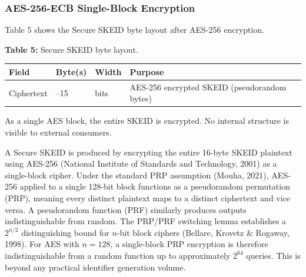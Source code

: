 \documentclass[fleqn,10pt]{wlpeerj}
\newcounter{none} %
\begin{document}
\subsubsection{AES-256-ECB Single-Block
Encryption}\label{aes-256-ecb-single-block-encryption}

Table 5 shows the Secure SKEID byte layout after AES-256 encryption.

\textbf{Table 5:} Secure SKEID byte layout.

{\def\LTcaptype{none} %
\begin{longtable}[]{@{}
  >{\raggedright\arraybackslash}p{}
  >{\raggedright\arraybackslash}p{}
  >{\raggedright\arraybackslash}p{}
  >{\raggedright\arraybackslash}p{}@{}}
\toprule\noalign{}
\begin{minipage}[b]{\linewidth}\raggedright
Field
\end{minipage} & \begin{minipage}[b]{\linewidth}\raggedright
Byte(s)
\end{minipage} & \begin{minipage}[b]{\linewidth}\raggedright
Width
\end{minipage} & \begin{minipage}[b]{\linewidth}\raggedright
Purpose
\end{minipage} \\
\midrule\noalign{}
\endhead
\bottomrule\noalign{}
\endlastfoot
Ciphertext & 0--15 & 128 bits & AES-256 encrypted SKEID (pseudorandom
bytes) \\
\end{longtable}
}

As a single AES block, the entire SKEID is encrypted. No internal
structure is visible to external consumers.

A Secure SKEID is produced by encrypting the entire 16-byte SKEID
plaintext using AES-256 (National Institute of Standards and Technology,
2001) as a single-block cipher. Under the standard PRP assumption
(Mouha, 2021), AES-256 applied to a single 128-bit block functions as a
pseudorandom permutation (PRP), meaning every distinct plaintext maps to
a distinct ciphertext and vice versa. A pseudorandom function (PRF)
similarly produces outputs indistinguishable from random. The PRP/PRF
switching lemma establishes a \(2^{n/2}\) distinguishing bound for
\(n\)-bit block ciphers (Bellare, Krovetz \& Rogaway, 1998). For AES
with \(n = 128\), a single-block PRP encryption is therefore
indistinguishable from a random function up to approximately \(2^{64}\)
queries. This is beyond any practical identifier generation volume.
\end{document}
